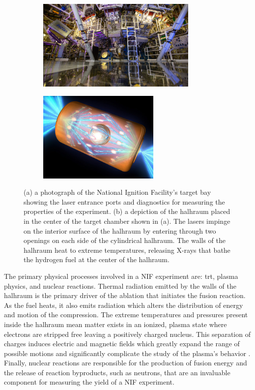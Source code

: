 \documentclass[../doc.tex]{subfiles}
\begin{document}
\begin{figure}
\centering
\begin{subfigure}{.49\textwidth}
	\centering
	\includegraphics[height=1.75in]{data/img/nif.jpg}
	\caption{}
	\label{intro:nif}
\end{subfigure}
\begin{subfigure}{.49\textwidth}
	\centering
	\includegraphics[height=1.75in]{data/img/halhraum.jpeg}
	\caption{}
	\label{intro:halhraum}
\end{subfigure}
\caption{(a) a photograph of the National Ignition Facility's target bay showing the laser entrance ports and diagnostics for measuring the properties of the experiment. (b) a depiction of the halhraum placed in the center of the target chamber shown in (a). The lasers impinge on the interior surface of the halhraum by entering through two openings on each side of the cylindrical halhraum. The walls of the halhraum heat to extreme temperatures, releasing X-rays that bathe the hydrogen fuel at the center of the halhraum. }
\end{figure}

The primary physical processes involved in a NIF experiment are: \gls{trt}, plasma physics, and nuclear reactions. Thermal radiation emitted by the walls of the halhraum is the primary driver of the ablation that initiates the fusion reaction. As the fuel heats, it also emits radiation which alters the distribution of energy and motion of the compression. The extreme temperatures and pressures present inside the halhraum mean matter exists in an ionized, plasma state where electrons are stripped free leaving a positively charged nucleus. This separation of charges induces electric and magnetic fields which greatly expand the range of possible motions and significantly complicate the study of the plasma's behavior \cite{chen2012introduction}. Finally, nuclear reactions are responsible for the production of fusion energy and the release of reaction byproducts, such as neutrons, that are an invaluable component for measuring the yield of a NIF experiment. 
\end{document}
